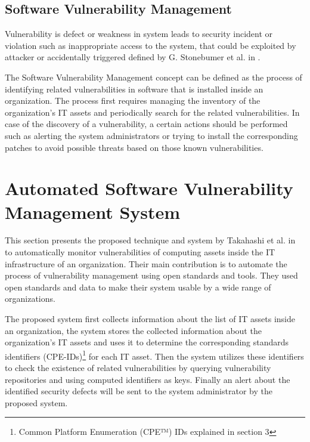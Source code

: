 \documentclass{llncs}
\begin{document}
       
\subsection{Software Vulnerability Management}

\par Vulnerability is defect or weakness in system leads to security incident or violation such as inappropriate access to the system, that could be exploited by attacker or accidentally triggered defined by G. Stonebumer et al. in \cite{vuln}.  

\par The Software Vulnerability Management concept can be defined as the process of identifying related vulnerabilities in software that is installed inside an organization. The process first requires managing the inventory of the organization's IT assets and  periodically search for the related vulnerabilities. In case of the discovery of a vulnerability, a certain actions should be performed such as alerting the system administrators or trying to install the corresponding patches to avoid possible threats based on those known vulnerabilities. 



   
\section{Automated Software Vulnerability Management System}

\par This section presents the proposed technique and system by Takahashi et al. in \cite{paper1} to automatically monitor vulnerabilities of computing assets inside the IT infrastructure of an organization. Their main contribution is to automate the process of vulnerability management using open standards and tools. They used open standards and data to make their system usable by a wide range of organizations.
\par
 The proposed system first collects information about the list of IT assets inside an organization, the system stores the collected information about the organization's IT assets and uses it to determine the corresponding standards identifiers (CPE-IDs)\footnote{ Common Platform Enumeration (CPE™) IDs explained in section 3} for each IT asset. Then the system utilizes these identifiers to check the existence of related vulnerabilities by querying vulnerability repositories and using computed identifiers as keys. Finally an alert about the identified security defects will be sent to the system administrator by the proposed system.
    
\end{document}

